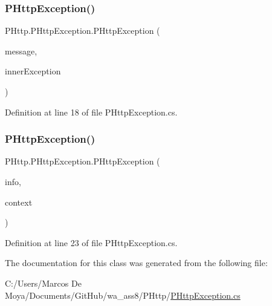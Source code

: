\mbox{\label{class_p_http_1_1_p_http_exception_a81280222492923fbff1782365f8e0789}} 
\subsubsection{\texorpdfstring{P\+Http\+Exception()}{PHttpException()}\hspace{0.1cm}{\footnotesize\ttfamily [3/4]}}
{\footnotesize\ttfamily P\+Http.\+P\+Http\+Exception.\+P\+Http\+Exception (\begin{DoxyParamCaption}\item[{string}]{message,  }\item[{Exception}]{inner\+Exception }\end{DoxyParamCaption})}



Definition at line 18 of file P\+Http\+Exception.\+cs.

\mbox{\label{class_p_http_1_1_p_http_exception_a1a15e386e4ccda2c1e275dde1d53f995}} 
\subsubsection{\texorpdfstring{P\+Http\+Exception()}{PHttpException()}\hspace{0.1cm}{\footnotesize\ttfamily [4/4]}}
{\footnotesize\ttfamily P\+Http.\+P\+Http\+Exception.\+P\+Http\+Exception (\begin{DoxyParamCaption}\item[{Serialization\+Info}]{info,  }\item[{Streaming\+Context}]{context }\end{DoxyParamCaption})\hspace{0.3cm}{\ttfamily [protected]}}



Definition at line 23 of file P\+Http\+Exception.\+cs.



The documentation for this class was generated from the following file\+:\begin{DoxyCompactItemize}
\item 
C\+:/\+Users/\+Marcos De Moya/\+Documents/\+Git\+Hub/wa\+\_\+ass8/\+P\+Http/\hyperlink{_p_http_exception_8cs}{P\+Http\+Exception.\+cs}\end{DoxyCompactItemize}
